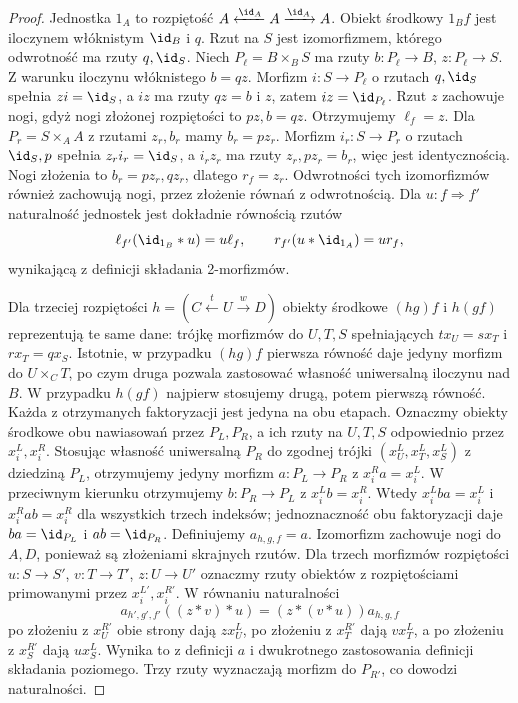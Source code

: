 \begin{proof}
Jednostka $1_A$ to rozpiętość $A\xleftarrow{\id_A}A\xrightarrow{\id_A}A$. Obiekt środkowy $1_Bf$ jest iloczynem włóknistym $\id_B$ i $q$. Rzut na $S$ jest izomorfizmem, którego odwrotność ma rzuty $q,\id_S$. Niech $P_\ell=B\times_B S$ ma rzuty $b:P_\ell\to B$, $z:P_\ell\to S$. Z warunku iloczynu włóknistego $b=qz$. Morfizm $i:S\to P_\ell$ o rzutach $q,\id_S$ spełnia $zi=\id_S$, a $iz$ ma rzuty $qz=b$ i $z$, zatem $iz=\id_{P_\ell}$. Rzut $z$ zachowuje nogi, gdyż nogi złożonej rozpiętości to $pz,b=qz$. Otrzymujemy $\ell_f=z$. Dla $P_r=S\times_A A$ z rzutami $z_r,b_r$ mamy $b_r=pz_r$. Morfizm $i_r:S\to P_r$ o rzutach $\id_S,p$ spełnia $z_ri_r=\id_S$, a $i_rz_r$ ma rzuty $z_r,pz_r=b_r$, więc jest identycznością. Nogi złożenia to $b_r=pz_r,qz_r$, dlatego $r_f=z_r$. Odwrotności tych izomorfizmów również zachowują nogi, przez złożenie równań z odwrotnością. Dla $u:f\Rightarrow f'$ naturalność jednostek jest dokładnie równością rzutów
\[
 \ell_{f'}(\id_{1_B}\ast u)=u\ell_f,\qquad
 r_{f'}(u\ast\id_{1_A})=ur_f,
\]
wynikającą z definicji składania 2-morfizmów.

Dla trzeciej rozpiętości $h=(C\xleftarrow{t}U\xrightarrow{w}D)$ obiekty środkowe $(hg)f$ i $h(gf)$ reprezentują te same dane: trójkę morfizmów do $U,T,S$ spełniających $t x_U=s x_T$ i $r x_T=q x_S$. Istotnie, w przypadku $(hg)f$ pierwsza równość daje jedyny morfizm do $U\times_C T$, po czym druga pozwala zastosować własność uniwersalną iloczynu nad $B$. W przypadku $h(gf)$ najpierw stosujemy drugą, potem pierwszą równość. Każda z otrzymanych faktoryzacji jest jedyna na obu etapach. Oznaczmy obiekty środkowe obu nawiasowań przez $P_L,P_R$, a ich rzuty na $U,T,S$ odpowiednio przez $x_i^L,x_i^R$. Stosując własność uniwersalną $P_R$ do zgodnej trójki $(x_U^L,x_T^L,x_S^L)$ z dziedziną $P_L$, otrzymujemy jedyny morfizm $a:P_L\to P_R$ z $x_i^Ra=x_i^L$. W przeciwnym kierunku otrzymujemy $b:P_R\to P_L$ z $x_i^Lb=x_i^R$. Wtedy $x_i^Lba=x_i^L$ i $x_i^Rab=x_i^R$ dla wszystkich trzech indeksów; jednoznaczność obu faktoryzacji daje $ba=\id_{P_L}$ i $ab=\id_{P_R}$. Definiujemy $a_{h,g,f}=a$. Izomorfizm zachowuje nogi do $A,D$, ponieważ są złożeniami skrajnych rzutów. Dla trzech morfizmów rozpiętości $u:S\to S'$, $v:T\to T'$, $z:U\to U'$ oznaczmy rzuty obiektów z rozpiętościami primowanymi przez $x_i^{L'},x_i^{R'}$. W równaniu naturalności
\[
 a_{h',g',f'}((z\ast v)\ast u)
 =(z\ast(v\ast u))a_{h,g,f}
\]
po złożeniu z $x_U^{R'}$ obie strony dają $zx_U^L$, po złożeniu z $x_T^{R'}$ dają $vx_T^L$, a po złożeniu z $x_S^{R'}$ dają $ux_S^L$. Wynika to z definicji $a$ i dwukrotnego zastosowania definicji składania poziomego. Trzy rzuty wyznaczają morfizm do $P_{R'}$, co dowodzi naturalności.


\end{proof}
